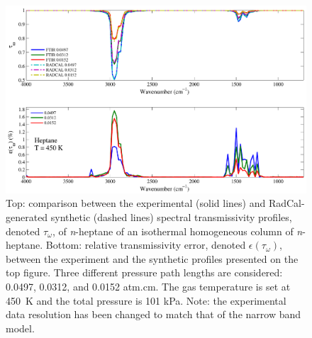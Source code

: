 \begin{figure}[p]
\includegraphics[width=\textwidth]{../Verification/Results_Test2/Heptane_450.pdf}
\caption{Top: comparison between the experimental (solid lines) and RadCal-generated synthetic (dashed lines) spectral transmissivity profiles, denoted $\tau_{\omega}$, of \textit{n}-heptane of an isothermal homogeneous column of \textit{n}-heptane. Bottom: relative transmissivity error, denoted $\epsilon{(\tau_{\omega})}$, between the experiment and the synthetic profiles presented on the top figure. Three different pressure path lengths are considered: 0.0497, 0.0312, and 0.0152 atm.cm. The gas temperature is set at 450~K and the total pressure is 101 kPa. Note: the experimental data resolution has been changed to match that of the narrow band model. \label{fig:nheptane_Verify_450K}}
\end{figure}

